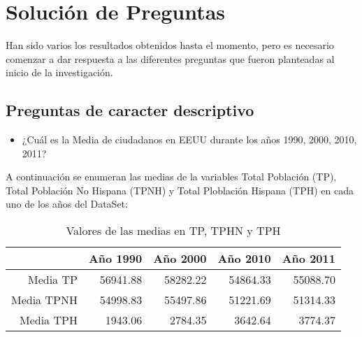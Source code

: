 

\section{Solución de Preguntas}
Han sido varios los resultados obtenidos hasta el momento, pero es necesario comenzar a dar respuesta a las diferentes preguntas que fueron planteadas al inicio de la investigación.

\subsection{Preguntas de caracter descriptivo}


\begin{itemize}
  \item ¿Cuál es la Media de ciudadanos en EEUU durante los años  1990, 2000, 2010, 2011?
\end{itemize}

A continuación se enumeran las medias de la variables Total Población (TP), Total Población  No Hispana (TPNH) y Total Ploblación Hispana (TPH) en cada uno de los años del DataSet:

\begin{table}[ht]
\centering
\begin{tabular}{rrrrr}
  \hline
 & Año 1990 & Año 2000 & Año 2010 & Año 2011 \\ 
  \hline
Media TP & 56941.88 & 58282.22 & 54864.33 & 55088.70 \\ 
  Media TPNH & 54998.83 & 55497.86 & 51221.69 & 51314.33 \\ 
  Media TPH & 1943.06 & 2784.35 & 3642.64 & 3774.37 \\ 
   \hline
\end{tabular}
\caption{Valores de las medias en TP, TPHN y TPH} 
\end{table}


